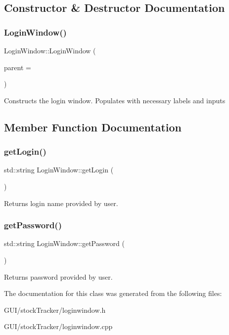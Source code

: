 \subsection{Constructor \& Destructor Documentation}
\mbox{\label{class_login_window_aacfb01de174b9eaf5a712bbfd4b6d9b5}} 
\subsubsection{\texorpdfstring{Login\+Window()}{LoginWindow()}}
{\footnotesize\ttfamily Login\+Window\+::\+Login\+Window (\begin{DoxyParamCaption}\item[{Q\+Widget $\ast$}]{parent = {} }\end{DoxyParamCaption})}

Constructs the login window. Populates with necessary labels and inputs 

\subsection{Member Function Documentation}
\mbox{\label{class_login_window_abb7c1af4eff6d4bcfcae122ee77089f1}} 
\subsubsection{\texorpdfstring{get\+Login()}{getLogin()}}
{\footnotesize\ttfamily std\+::string Login\+Window\+::get\+Login (\begin{DoxyParamCaption}{ }\end{DoxyParamCaption})}

Returns login name provided by user. \mbox{\label{class_login_window_a708710b83651cfa427d8f213b6a1890e}} 
\subsubsection{\texorpdfstring{get\+Password()}{getPassword()}}
{\footnotesize\ttfamily std\+::string Login\+Window\+::get\+Password (\begin{DoxyParamCaption}{ }\end{DoxyParamCaption})}

Returns password provided by user. 

The documentation for this class was generated from the following files\+:\begin{DoxyCompactItemize}
\item 
G\+U\+I/stock\+Tracker/loginwindow.\+h\item 
G\+U\+I/stock\+Tracker/loginwindow.\+cpp\end{DoxyCompactItemize}
